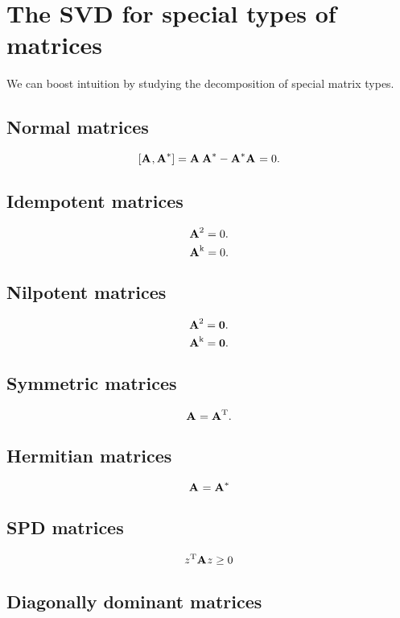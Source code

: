 \section[Special types]{The SVD for special types of matrices}
We can boost intuition by studying the decomposition of special matrix types.

\subsection{Normal matrices}
\begin{equation}
  \left[ \textbf{A}^{\mathrm{}},\textbf{A}^{\mathrm{*}} \right] = \textbf{A}^{\mathrm{}}\,\textbf{A}^{\mathrm{ \mathrm{*} }} - \textbf{A}^{\mathrm{ \mathrm{*} }}\textbf{A}^{\mathrm{}} = 0.
\end{equation}

\subsection{Idempotent matrices}
\begin{equation}
  \textbf{A}^{\mathrm{2}} = 0.
\end{equation}
\begin{equation}
  \textbf{A}^{\mathrm{k}} = 0.
\end{equation}

\subsection{Nilpotent matrices}
\begin{equation}
  \textbf{A}^{\mathrm{2}} = \textbf{0}.
\end{equation}
\begin{equation}
  \textbf{A}^{\mathrm{k}} = \textbf{0}.
\end{equation}

\subsection{Symmetric matrices}
\begin{equation}
  \textbf{A}^{\mathrm{}} = \textbf{A}^{\mathrm{T}}.
\end{equation}

\subsection{Hermitian matrices}
\begin{equation}
  \textbf{A}^{\mathrm{}} = \textbf{A}^{\mathrm{*}}
\end{equation}

\subsection{SPD matrices}
\begin{equation}
  z^{\mathrm{T}}\textbf{A}^{\mathrm{}}z \ge 0
\end{equation}

\subsection{Diagonally dominant matrices}


\endinput